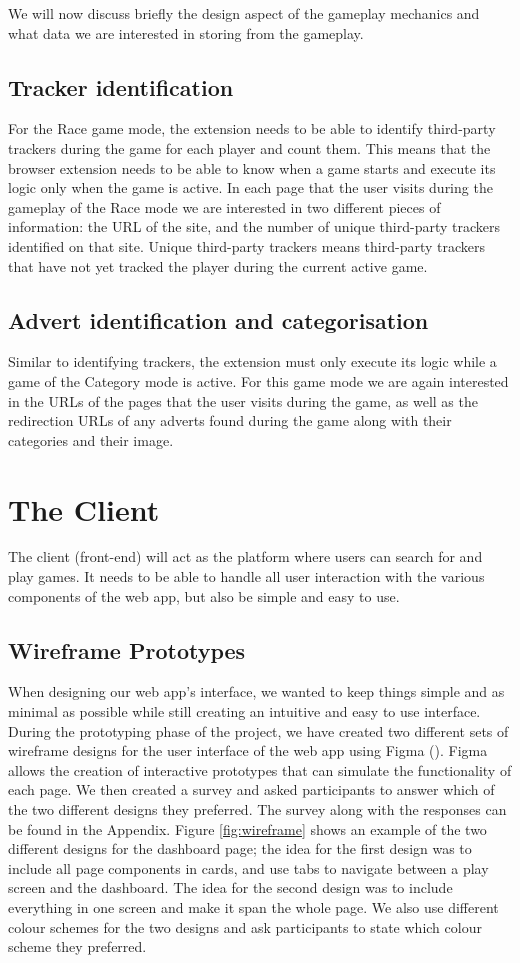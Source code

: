 \documentclass{l4proj}
\begin{document}
We will now discuss briefly the design aspect of the gameplay mechanics and what data we are interested in storing from the gameplay.

\subsection{Tracker identification}
For the Race game mode, the extension needs to be able to identify third-party trackers during the game for each player and count them. This means that the browser extension needs to be able to know when a game starts and execute its logic only when the game is active. In each page that the user visits during the gameplay of the Race mode we are interested in two different pieces of information: the URL of the site, and the number of unique third-party trackers identified on that site. Unique third-party trackers means third-party trackers that have not yet tracked the player during the current active game.

\subsection{Advert identification and categorisation}
Similar to identifying trackers, the extension must only execute its logic while a game of the Category mode is active. For this game mode we are again interested in the URLs of the pages that the user visits during the game, as well as the redirection URLs of any adverts found during the game along with their categories and their image. 

\section{The Client}
The client (front-end) will act as the platform where users can search for and play games. It needs to be able to handle all user interaction with the various components of the web app, but also be simple and easy to use.

\subsection{Wireframe Prototypes}
When designing our web app's interface, we wanted to keep things simple and as minimal as possible while still creating an intuitive and easy to use interface. During the prototyping phase of the project, we have created two different sets of wireframe designs for the user interface of the web app using Figma (\cite{figma}). Figma allows the creation of interactive prototypes that can simulate the functionality of each page. We then created a survey and asked participants to answer which of the two different designs they preferred. The survey along with the responses can be found in the Appendix. Figure \ref{fig:wireframe} shows an example of the two different designs for the dashboard page; the idea for the first design was to include all page components in cards, and use tabs to navigate between a play screen and the dashboard. The idea for the second design was to include everything in one screen and make it span the whole page. We also use different colour schemes for the two designs and ask participants to state which colour scheme they preferred.
\end{document}
